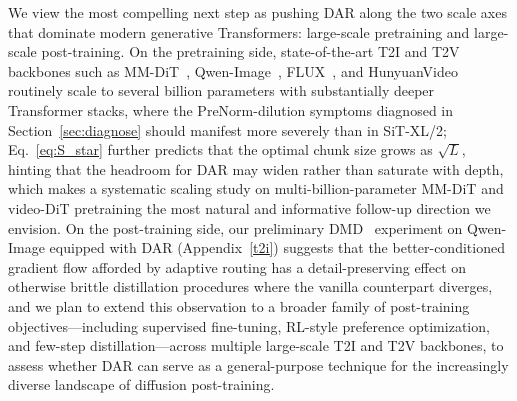 \documentclass{llmxive}
\begin{document}
We view the most compelling next step as pushing \textsc{DAR} along the two scale axes that dominate modern generative Transformers: large-scale pretraining and large-scale post-training. On the pretraining side, state-of-the-art T2I and T2V backbones such as MM-DiT~\citep{esser2024scaling}, Qwen-Image~\citep{wu2025qwen}, FLUX~\citep{flux2024}, and HunyuanVideo~\citep{kong2024hunyuanvideo} routinely scale to several billion parameters with substantially deeper Transformer stacks, where the PreNorm-dilution symptoms diagnosed in Section~\ref{sec:diagnose} should manifest more severely than in SiT-XL/2; Eq.~\eqref{eq:S_star} further predicts that the optimal chunk size grows as $\sqrt{L}$, hinting that the headroom for \textsc{DAR} may widen rather than saturate with depth, which makes a systematic scaling study on multi-billion-parameter MM-DiT and video-DiT pretraining the most natural and informative follow-up direction we envision. On the post-training side, our preliminary DMD~\citep{yin2024one,yin2024improved} experiment on Qwen-Image equipped with \textsc{DAR} (Appendix~\ref{t2i}) suggests that the better-conditioned gradient flow afforded by adaptive routing has a detail-preserving effect on otherwise brittle distillation procedures where the vanilla counterpart diverges, and we plan to extend this observation to a broader family of post-training objectives---including supervised fine-tuning, RL-style preference optimization, and few-step distillation---across multiple large-scale T2I and T2V backbones, to assess whether \textsc{DAR} can serve as a general-purpose technique for the increasingly diverse landscape of diffusion post-training.


% 
\end{document}

